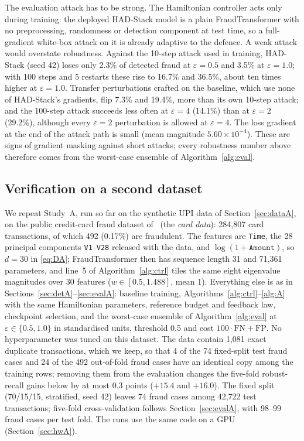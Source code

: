 \documentclass[conference]{IEEEtran}
\begin{document}
The evaluation attack has to be strong. The Hamiltonian controller acts only during training: the deployed HAD-Stack model is a plain FraudTransformer with no preprocessing, randomness or detection component at test time, so a full-gradient white-box attack on it is already adaptive to the defence. A weak attack would overstate robustness. Against the 10-step attack used in training, HAD-Stack (seed 42) loses only 2.3\% of detected fraud at $\varepsilon{=}0.5$ and 3.5\% at $\varepsilon{=}1.0$; with 100 steps and 5 restarts these rise to 16.7\% and 36.5\%, about ten times higher at $\varepsilon{=}1.0$. Transfer perturbations crafted on the baseline, which use none of HAD-Stack's gradients, flip 7.3\% and 19.4\%, more than its own 10-step attack; and the 100-step attack succeeds less often at $\varepsilon{=}4$ (14.1\%) than at $\varepsilon{=}2$ (29.2\%), although every $\varepsilon{=}2$ perturbation is allowed at $\varepsilon{=}4$. The loss gradient at the end of the attack path is small (mean magnitude $5.60{\times}10^{-4}$). These are signs of gradient masking against short attacks; every robustness number above therefore comes from the worst-case ensemble of Algorithm~\ref{alg:eval}.

\subsection{Verification on a second dataset}\label{sec:verA}
We repeat Study~A, run so far on the synthetic UPI data of Section~\ref{sec:dataA}, on the public credit-card fraud dataset of~\cite{dalpozzolo2015} (the \emph{card data}): 284,807 card transactions, of which 492 (0.17\%) are fraudulent. The features are \texttt{Time}, the 28 principal components \texttt{V1}--\texttt{V28} released with the data, and $\log(1+\texttt{Amount})$, so $d=30$ in \eqref{eq:DA}; FraudTransformer then has sequence length 31 and 71,361 parameters, and line~5 of Algorithm~\ref{alg:ctrl} tiles the same eight eigenvalue magnitudes over 30 features ($w\in[0.5,1.488]$, mean 1). Everything else is as in Sections~\ref{sec:detA}--\ref{sec:evalA}: baseline training, Algorithms~\ref{alg:ctrl}--\ref{alg:A} with the same Hamiltonian parameters, reference budget and feedback law, checkpoint selection, and the worst-case ensemble of Algorithm~\ref{alg:eval} at $\varepsilon\in\{0.5,1.0\}$ in standardised units, threshold 0.5 and cost $100\cdot\mathrm{FN}+\mathrm{FP}$. No hyperparameter was tuned on this dataset. The data contain 1,081 exact duplicate transactions, which we keep, so that 4 of the 74 fixed-split test fraud cases and 24 of the 492 out-of-fold fraud cases have an identical copy among the training rows; removing them from the evaluation changes the five-fold robust-recall gains below by at most 0.3 points ($+15.4$ and $+16.0$). The fixed split (70/15/15, stratified, seed 42) leaves 74 fraud cases among 42,722 test transactions; five-fold cross-validation follows Section~\ref{sec:evalA}, with 98--99 fraud cases per test fold. The runs use the same code on a GPU (Section~\ref{sec:hwA}).
\end{document}
